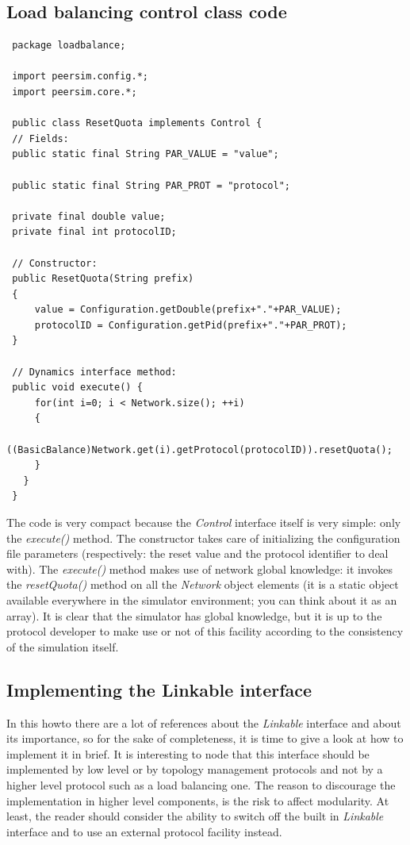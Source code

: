 \documentclass[a4paper,11pt]{article}
\begin{document}
\subsection{Load balancing control class code}

\footnotesize
\begin{verbatim}
 package loadbalance;
 
 import peersim.config.*;
 import peersim.core.*;
 
 public class ResetQuota implements Control {
 // Fields:
 public static final String PAR_VALUE = "value";
 
 public static final String PAR_PROT = "protocol";
 
 private final double value;
 private final int protocolID;
 
 // Constructor:
 public ResetQuota(String prefix)
 {
     value = Configuration.getDouble(prefix+"."+PAR_VALUE);
     protocolID = Configuration.getPid(prefix+"."+PAR_PROT);
 }
 
 // Dynamics interface method:
 public void execute() {
     for(int i=0; i < Network.size(); ++i)
     {
         ((BasicBalance)Network.get(i).getProtocol(protocolID)).resetQuota();
     }
   }
 }
\end{verbatim}
\normalsize

The code is very compact because the \emph{Control} interface itself
is very simple: only the \emph{execute()} method. The constructor takes
care of initializing the configuration file parameters (respectively:
the reset value and the protocol identifier to deal with). The \emph{execute()}
method makes use of network global knowledge: it invokes the \emph{resetQuota()}
method on all the \emph{Network} object elements (it is a static
object available everywhere in the simulator environment; you can think
about it as an array). It is clear that the simulator has global knowledge,
but it is up to the protocol developer to make use or not of this
facility according to the consistency of the simulation itself. 


\subsection{Implementing the Linkable interface}

In this howto there are a lot of references about the \emph{Linkable}
interface and about its importance, so for the sake of completeness,
it is time to give a look at how to implement it in brief. It is interesting
to node that this interface should be implemented by low level or
by topology management protocols and not by a higher level protocol
such as a load balancing one. The reason to discourage the
implementation in higher level components,
is the risk to affect modularity. At least, the reader should consider
the ability to switch off the built in \emph{Linkable} interface and
to use an external protocol facility instead.
\end{document}

